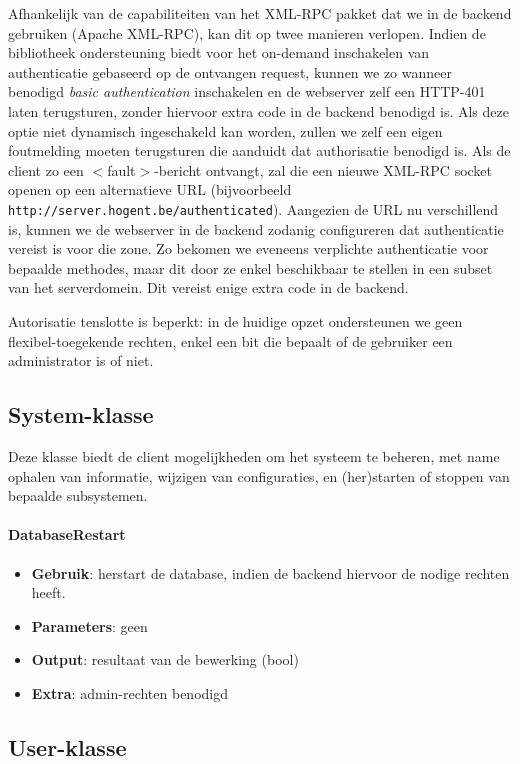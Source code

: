 Afhankelijk van de capabiliteiten van het XML-RPC pakket dat we in de backend gebruiken (Apache XML-RPC), kan dit op twee manieren verlopen. Indien de bibliotheek ondersteuning biedt voor het on-demand inschakelen van authenticatie gebaseerd op de ontvangen request, kunnen we zo wanneer benodigd \emph{basic authentication} inschakelen en de webserver zelf een HTTP-401 laten terugsturen, zonder hiervoor extra code in de backend benodigd is.
Als deze optie niet dynamisch ingeschakeld kan worden, zullen we zelf een eigen foutmelding moeten terugsturen die aanduidt dat authorisatie benodigd is. Als de client zo een $<$fault$>$-bericht ontvangt, zal die een nieuwe XML-RPC socket openen op een alternatieve URL (bijvoorbeeld \texttt{http://server.hogent.be/authenticated}). Aangezien de URL nu verschillend is, kunnen we de webserver in de backend zodanig configureren dat authenticatie vereist is voor die zone. Zo bekomen we eveneens verplichte authenticatie voor bepaalde methodes, maar dit door ze enkel beschikbaar te stellen in een subset van het serverdomein. Dit vereist enige extra code in de backend.

Autorisatie tenslotte is beperkt: in de huidige opzet ondersteunen we geen flexibel-toegekende rechten, enkel een bit die bepaalt of de gebruiker een administrator is of niet.

\subsection{System-klasse}

Deze klasse biedt de client mogelijkheden om het systeem te beheren, met name ophalen van informatie, wijzigen van configuraties, en (her)starten of stoppen van bepaalde subsystemen.

\paragraph{DatabaseRestart}
\begin{itemize}
\item{\textbf{Gebruik}: herstart de database, indien de backend hiervoor de nodige rechten heeft.}
\item{\textbf{Parameters}: geen}
\item{\textbf{Output}: resultaat van de bewerking (bool)}
\item{\textbf{Extra}: admin-rechten benodigd}
\end{itemize}

\subsection{User-klasse}

